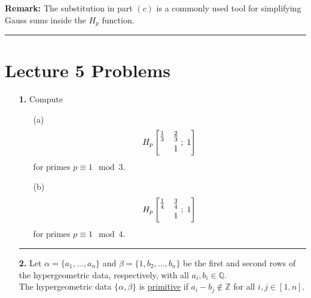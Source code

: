 \documentclass[12pt]{amsart}
\theoremstyle{definition}
\theoremstyle{remark}
\numberwithin{equation}{section}
\def\Z{{\mathbb Z}}
\def\Q{{\mathbb Q}}
\def\Z{\mathbb{Z}}
\def\Q{\mathbb{Q}}
\begin{document}
\begin{itemize}
\vspace{4mm}

\textbf{Remark:} The substitution in part $(c)$ is a commonly used tool for simplifying Gauss sums inside the $H_{p}$ function.

\vspace{8mm}

\hrule{}

\vspace{8mm}

\section*{Lecture 5 Problems}

\begin{itemize}
\item[\textbf{1.}] Compute 
\vspace{5mm}

\begin{itemize}

\item[(a)] $$H_{p}\left[\begin{matrix} \frac{1}{3} & \frac{2}{3} \smallskip \\   & 1 \end{matrix} \; ; \; 1 \right]$$ for primes $p \equiv 1 \mod 3$.
    \vspace{5mm}

    \vspace{5mm}

\item[(b)] $$H_{p}\left[\begin{matrix} \frac{1}{4} & \frac{3}{4} \smallskip \\   & 1 \end{matrix} \; ; \; 1 \right]$$ for primes $p \equiv 1 \mod 4$.
\end{itemize}

\vspace{8mm}

\hrule{}

\vspace{4mm}

\item[\textbf{2.}] Let $\alpha = \{a_{1}, \ldots, a_{n}\}$ and $\beta = \{1,b_{2}, \ldots, b_{n}\}$ be the first and second rows of the hypergeometric data, respectively, with all $a_{i}, b_{i} \in \Q$.
\\

The hypergeometric data $\{\alpha, \beta\}$ is \underline{primitive} if $a_{i}-b_{j} \notin \Z$ for all $i,j \in [1,n]$. 


\end{itemize}
\end{itemize}
\end{document}
